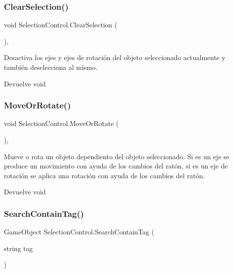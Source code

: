 \subsubsection{\texorpdfstring{ClearSelection()}{ClearSelection()}}
{\footnotesize\ttfamily void Selection\+Control.\+Clear\+Selection (\begin{DoxyParamCaption}{ }\end{DoxyParamCaption})\hspace{0.3cm}{\ttfamily [inline]}, {\ttfamily [private]}}

Desactiva los ejes y ejes de rotación del objeto seleccionado actualmente y también deselecciona al mismo. \begin{DoxyReturn}{Devuelve}
void 
\end{DoxyReturn}
\mbox{\label{class_selection_control_a9684b6a02a6e31a00c6a87b5e9d29f62}} 
\subsubsection{\texorpdfstring{MoveOrRotate()}{MoveOrRotate()}}
{\footnotesize\ttfamily void Selection\+Control.\+Move\+Or\+Rotate (\begin{DoxyParamCaption}{ }\end{DoxyParamCaption})\hspace{0.3cm}{\ttfamily [inline]}, {\ttfamily [private]}}

Mueve o rota un objeto dependiento del objeto seleccionado. Si es un eje se produce un movimiento con ayuda de los cambios del ratón, si es un eje de rotación se aplica una rotación con ayuda de los cambios del ratón. \begin{DoxyReturn}{Devuelve}
void 
\end{DoxyReturn}
\mbox{\label{class_selection_control_a8e92014a9781e84be7079f4dfd96caf9}} 
\subsubsection{\texorpdfstring{SearchContainTag()}{SearchContainTag()}}
{\footnotesize\ttfamily Game\+Object Selection\+Control.\+Search\+Contain\+Tag (\begin{DoxyParamCaption}\item[{string}]{tag }\end{DoxyParamCaption})\hspace{0.3cm}{\ttfamily [inline]}}

